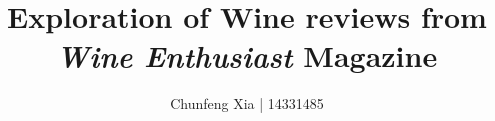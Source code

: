 \documentclass[11pt, twocolumn]{article}
\begin{document}
\title{Exploration of Wine reviews from \emph{Wine Enthusiast} Magazine}
\author{Chunfeng Xia | 14331485}
\date{}
\maketitle


\end{document}
